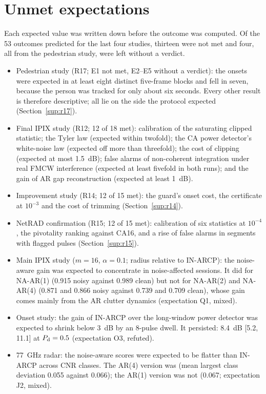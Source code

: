 \documentclass[10pt]{article}
\begin{document}
\section{Unmet expectations}\label{sup:unmet}
Each expected value was written down before the outcome was computed. Of the 53 outcomes predicted for the last four studies, thirteen were not met and four, all from the pedestrian study, were left without a verdict.
\begin{itemize}
\item Pedestrian study (R17; E1 not met, E2--E5 without a verdict): the onsets were expected in at least eight distinct five-frame blocks and fell in seven, because the person was tracked for only about six seconds. Every other result is therefore descriptive; all lie on the side the protocol expected (Section~\ref{sup:r17}).
\item Final IPIX study (R12; 12 of 18 met): calibration of the saturating clipped statistic; the Tyler law (expected within twofold); the CA power detector's white-noise law (expected off more than threefold); the cost of clipping (expected at most 1.5~dB); false alarms of non-coherent integration under real FMCW interference (expected at least fivefold in both runs); and the gain of AR gap reconstruction (expected at least 1~dB).
\item Improvement study (R14; 12 of 15 met): the guard's onset cost, the certificate at $10^{-3}$ and the cost of trimming (Section~\ref{sup:r14}).
\item NetRAD confirmation (R15; 12 of 15 met): calibration of six statistics at $10^{-4}$, the pivotality ranking against CA16, and a rise of false alarms in segments with flagged pulses (Section~\ref{sup:r15}).
\item Main IPIX study ($m=16$, $\alpha=0.1$; radius relative to IN-ARCP): the noise-aware gain was expected to concentrate in noise-affected sessions. It did for NA-AR(1) (0.915 noisy against 0.989 clean) but not for NA-AR(2) and NA-AR(4) (0.871 and 0.866 noisy against 0.739 and 0.709 clean), whose gain comes mainly from the AR clutter dynamics (expectation Q1, mixed).
\item Onset study: the gain of IN-ARCP over the long-window power detector was expected to shrink below 3~dB by an 8-pulse dwell. It persisted: 8.4~dB [5.2, 11.1] at $P_{\rm d}=0.5$ (expectation O3, refuted).
\item 77~GHz radar: the noise-aware scores were expected to be flatter than IN-ARCP across CNR classes. The AR(4) version was (mean largest class deviation 0.055 against 0.066); the AR(1) version was not (0.067; expectation J2, mixed).

\end{itemize}
\end{document}
